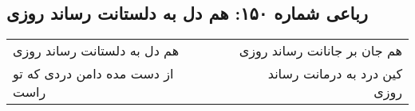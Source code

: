\begin{center}
\section*{رباعی شماره ۱۵۰: هم دل به دلستانت رساند روزی}
\label{sec:150}
\begin{longtable}{l p{0.5cm} r}
هم دل به دلستانت رساند روزی
&&
هم جان بر جانانت رساند روزی
\\
از دست مده دامن دردی که تو راست
&&
کین درد به درمانت رساند روزی
\\
\end{longtable}
\end{center}
